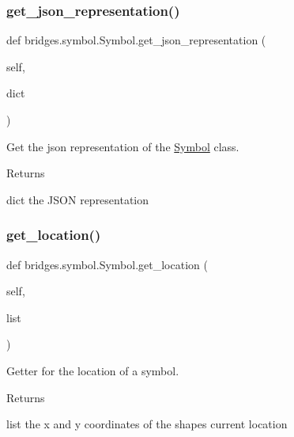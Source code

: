 \subsubsection{\texorpdfstring{get\+\_\+json\+\_\+representation()}{get\_json\_representation()}}
{\footnotesize\ttfamily def bridges.\+symbol.\+Symbol.\+get\+\_\+json\+\_\+representation (\begin{DoxyParamCaption}\item[{}]{self,  }\item[{}]{dict }\end{DoxyParamCaption})}



Get the json representation of the \hyperlink{classbridges_1_1symbol_1_1_symbol}{Symbol} class. 

\begin{DoxyReturn}{Returns}


dict the J\+S\+ON representation 
\end{DoxyReturn}
\mbox{\label{classbridges_1_1symbol_1_1_symbol_a8abbc9a5c77eb7e2ef40338102a145c4}} 
\subsubsection{\texorpdfstring{get\+\_\+location()}{get\_location()}}
{\footnotesize\ttfamily def bridges.\+symbol.\+Symbol.\+get\+\_\+location (\begin{DoxyParamCaption}\item[{}]{self,  }\item[{}]{list }\end{DoxyParamCaption})}



Getter for the location of a symbol. 

\begin{DoxyReturn}{Returns}


list the x and y coordinates of the shape\textquotesingle{}s current location 
\end{DoxyReturn}
\mbox{\label{classbridges_1_1symbol_1_1_symbol_ab6701b43acd3e24077b1bc385b35fdf1}} 
